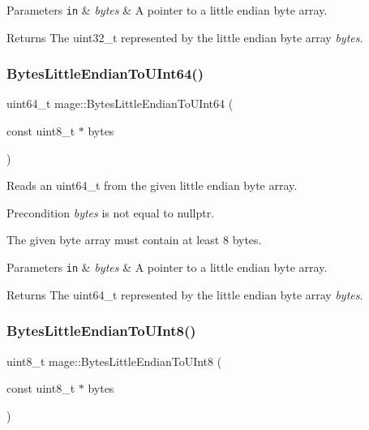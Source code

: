\begin{DoxyParams}[1]{Parameters}
\mbox{\tt in}  & {\em bytes} & A pointer to a little endian byte array. \\
\hline
\end{DoxyParams}
\begin{DoxyReturn}{Returns}
The {\ttfamily uint32\+\_\+t} represented by the little endian byte array {\itshape bytes}. 
\end{DoxyReturn}
\hypertarget{namespacemage_ae6f54de05a834fbb34a75312479009ba}{}\label{namespacemage_ae6f54de05a834fbb34a75312479009ba} 
\subsubsection{\texorpdfstring{Bytes\+Little\+Endian\+To\+U\+Int64()}{BytesLittleEndianToUInt64()}}
{\footnotesize\ttfamily uint64\+\_\+t mage\+::\+Bytes\+Little\+Endian\+To\+U\+Int64 (\begin{DoxyParamCaption}\item[{const uint8\+\_\+t $\ast$}]{bytes }\end{DoxyParamCaption})}

Reads an uint64\+\_\+t from the given little endian byte array.

\begin{DoxyPrecond}{Precondition}
{\itshape bytes} is not equal to {\ttfamily nullptr}. 

The given byte array must contain at least 8 bytes. 
\end{DoxyPrecond}

\begin{DoxyParams}[1]{Parameters}
\mbox{\tt in}  & {\em bytes} & A pointer to a little endian byte array. \\
\hline
\end{DoxyParams}
\begin{DoxyReturn}{Returns}
The {\ttfamily uint64\+\_\+t} represented by the little endian byte array {\itshape bytes}. 
\end{DoxyReturn}
\hypertarget{namespacemage_ac06182df9bf408e6de663497d9760724}{}\label{namespacemage_ac06182df9bf408e6de663497d9760724} 
\subsubsection{\texorpdfstring{Bytes\+Little\+Endian\+To\+U\+Int8()}{BytesLittleEndianToUInt8()}}
{\footnotesize\ttfamily uint8\+\_\+t mage\+::\+Bytes\+Little\+Endian\+To\+U\+Int8 (\begin{DoxyParamCaption}\item[{const uint8\+\_\+t $\ast$}]{bytes }\end{DoxyParamCaption})}


